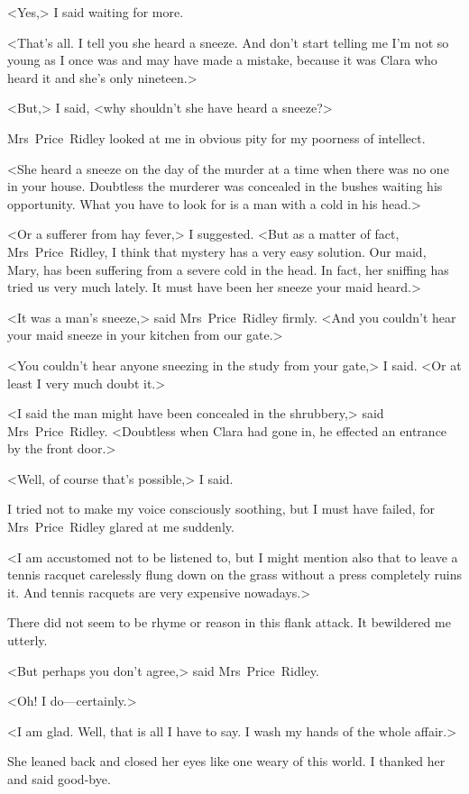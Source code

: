<Yes,> I said waiting for more.

<That's all. I tell you she heard a sneeze. And don't start telling me I'm not so young as I once was and may have made a mistake, because it was Clara who heard it and she's only nineteen.>

<But,> I said, <why shouldn't she have heard a sneeze?>

Mrs~Price~Ridley looked at me in obvious pity for my poorness of intellect.

<She heard a sneeze on the day of the murder at a time when there was no one in your house. Doubtless the murderer was concealed in the bushes waiting his opportunity. What you have to look for is a man with a cold in his head.>

<Or a sufferer from hay fever,> I suggested. <But as a matter of fact, Mrs~Price~Ridley, I think that mystery has a very easy solution. Our maid, Mary, has been suffering from a severe cold in the head. In fact, her sniffing has tried us very much lately. It must have been her sneeze your maid heard.>

<It was a man's sneeze,> said Mrs~Price~Ridley firmly. <And you couldn't hear your maid sneeze in your kitchen from our gate.>

<You couldn't hear anyone sneezing in the study from your gate,> I said. <Or at least I very much doubt it.>

<I said the man might have been concealed in the shrubbery,> said Mrs~Price~Ridley. <Doubtless when Clara had gone in, he effected an entrance by the front door.>

<Well, of course that's possible,> I said.

I tried not to make my voice consciously soothing, but I must have failed, for Mrs~Price~Ridley glared at me suddenly.

<I am accustomed not to be listened to, but I might mention also that to leave a tennis racquet carelessly flung down on the grass without a press completely ruins it. And tennis racquets are very expensive nowadays.>

There did not seem to be rhyme or reason in this flank attack. It bewildered me utterly.

<But perhaps you don't agree,> said Mrs~Price~Ridley.

<Oh! I do—certainly.>

<I am glad. Well, that is all I have to say. I wash my hands of the whole affair.>

She leaned back and closed her eyes like one weary of this world. I thanked her and said good-bye.

